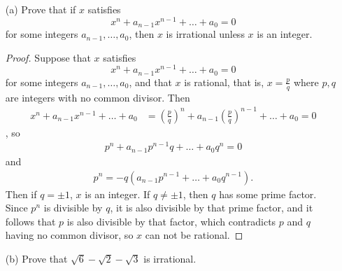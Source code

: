 \documentclass{article}
\begin{document}
\begin{enumerate}
	\item[(a)] Prove that if $x$ satisfies \[x^n + a_{n-1}x^{n-1} + \dots + a_0 = 0\] for some integers $a_{n-1}, \dots, a_0$, then $x$ is irrational unless $x$ is an integer.
	
	\begin{proof}
		Suppose that $x$ satisfies \[x^n + a_{n-1}x^{n-1} + \dots + a_0 = 0\] for some integers $a_{n-1}, \dots, a_0$, and that $x$ is rational, that is, $x = \frac{p}{q}$ where $p, q$ are integers with no common divisor. Then
		\begin{align*}
			x^n + a_{n-1}x^{n-1} + \dots + a_0 &= \left(\frac{p}{q}\right)^n + a_{n-1}\left(\frac{p}{q}\right)^{n-1} + \dots + a_0 = 0
		\end{align*}, so
		\begin{align*}
			p^n + a_{n-1}p^{n-1}q + \dots + a_0q^n = 0 
		\end{align*} and
		\begin{align*}
			p^n = -q\left(a_{n-1}p^{n-1} + \dots + a_0q^{n-1}\right).
		\end{align*}
		Then if $q = \pm1$, $x$ is an integer. If $q \ne \pm1$, then $q$ has some prime factor. Since $p^n$ is divisible by $q$, it is also divisible by that prime factor, and it follows that $p$ is also divisible by that factor, which contradicts $p$ and $q$ having no common divisor, so $x$ can not be rational.
	\end{proof}

	\item[(b)] Prove that $\sqrt{6} - \sqrt{2} - \sqrt{3}$ is irrational.
	

\end{enumerate}
\end{document}
